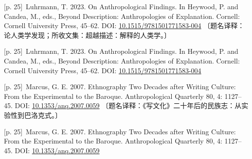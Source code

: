 \documentclass[10pt,a4paper]{article}
\begin{document}
\noindent\begin{minipage}{\textwidth}\begin{minipage}[t]{\dimexpr.5\textwidth-4mm\relax}\noindent\begin{minipage}[t]{\linewidth}{\scriptsize\color{gray} [p. 25]}\ Luhrmann, T. 2023. On Anthropological Findings. In Heywood, P. and Candea, M., eds., Beyond Description: Anthropologies of Explanation. Cornell: Cornell University Press, 45–62. DOI: \url{10.1515/9781501771583-004} 〔题名译释：论人类学发现；所收文集：超越描述：解释的人类学。〕\par\end{minipage}\par\end{minipage}\hfill\begin{minipage}[t]{\dimexpr.5\textwidth-4mm\relax}\noindent\begin{minipage}[t]{\linewidth}{\scriptsize\color{gray} [p. 25]}\ Luhrmann, T. 2023. On Anthropological Findings. In Heywood, P. and Candea, M., eds., Beyond Description: Anthropologies of Explanation. Cornell: Cornell University Press, 45–62. DOI: \url{10.1515/9781501771583-004}\par\end{minipage}\par\end{minipage}\end{minipage}\par
\noindent\begin{minipage}{\textwidth}\begin{minipage}[t]{\dimexpr.5\textwidth-4mm\relax}\noindent\begin{minipage}[t]{\linewidth}{\scriptsize\color{gray} [p. 25]}\ Marcus, G. E. 2007. Ethnography Two Decades after Writing Culture: From the Experimental to the Baroque. Anthropological Quarterly 80, 4: 1127–45. DOI: \url{10.1353/anq.2007.0059} 〔题名译释：《写文化》二十年后的民族志：从实验性到巴洛克式。〕\par\end{minipage}\par\end{minipage}\hfill\begin{minipage}[t]{\dimexpr.5\textwidth-4mm\relax}\noindent\begin{minipage}[t]{\linewidth}{\scriptsize\color{gray} [p. 25]}\ Marcus, G. E. 2007. Ethnography Two Decades after Writing Culture: From the Experimental to the Baroque. Anthropological Quarterly 80, 4: 1127–45. DOI: \url{10.1353/anq.2007.0059}\par\end{minipage}\par\end{minipage}\end{minipage}\par
\end{document}
